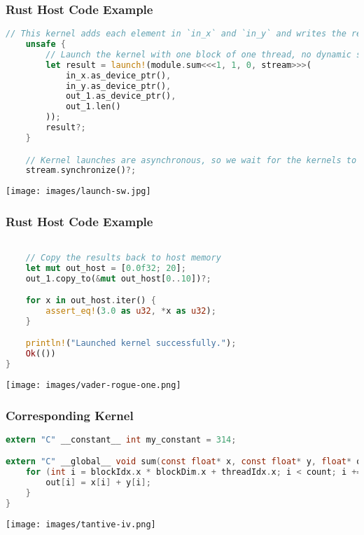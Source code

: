 \begin{frame}[fragile]
\frametitle{Rust Host Code Example}
\begin{lstlisting}[language=Rust]
    // This kernel adds each element in `in_x` and `in_y` and writes the result into `out`.
    unsafe {
        // Launch the kernel with one block of one thread, no dynamic shared memory on `stream`.
        let result = launch!(module.sum<<<1, 1, 0, stream>>>(
            in_x.as_device_ptr(),
            in_y.as_device_ptr(),
            out_1.as_device_ptr(),
            out_1.len()
        ));
        result?;
    }

    // Kernel launches are asynchronous, so we wait for the kernels to finish executing.
    stream.synchronize()?;
\end{lstlisting}

\begin{center}
	\texttt{[image: images/launch-sw.jpg]}
\end{center}

\end{frame}


\begin{frame}[fragile]
\frametitle{Rust Host Code Example}
\begin{lstlisting}[language=Rust]

    // Copy the results back to host memory
    let mut out_host = [0.0f32; 20];
    out_1.copy_to(&mut out_host[0..10])?;

    for x in out_host.iter() {
        assert_eq!(3.0 as u32, *x as u32);
    }

    println!("Launched kernel successfully.");
    Ok(())
}
\end{lstlisting}
\vspace{-1em}
\begin{center}
	\texttt{[image: images/vader-rogue-one.png]}
\end{center}

\end{frame}


\begin{frame}[fragile]
\frametitle{Corresponding Kernel}

\begin{lstlisting}[language=C]
extern "C" __constant__ int my_constant = 314;

extern "C" __global__ void sum(const float* x, const float* y, float* out, int count) {
    for (int i = blockIdx.x * blockDim.x + threadIdx.x; i < count; i += blockDim.x * gridDim.x) {
        out[i] = x[i] + y[i];
    }
}
\end{lstlisting}


\begin{center}
	\texttt{[image: images/tantive-iv.png]}
\end{center}
\end{frame}

